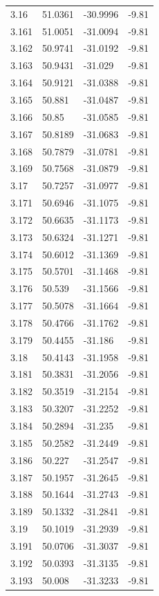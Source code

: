 \begin{tabular}{llll}
3.16 & 51.0361 & -30.9996 & -9.81 \\
3.161 & 51.0051 & -31.0094 & -9.81 \\
3.162 & 50.9741 & -31.0192 & -9.81 \\
3.163 & 50.9431 & -31.029 & -9.81 \\
3.164 & 50.9121 & -31.0388 & -9.81 \\
3.165 & 50.881 & -31.0487 & -9.81 \\
3.166 & 50.85 & -31.0585 & -9.81 \\
3.167 & 50.8189 & -31.0683 & -9.81 \\
3.168 & 50.7879 & -31.0781 & -9.81 \\
3.169 & 50.7568 & -31.0879 & -9.81 \\
3.17 & 50.7257 & -31.0977 & -9.81 \\
3.171 & 50.6946 & -31.1075 & -9.81 \\
3.172 & 50.6635 & -31.1173 & -9.81 \\
3.173 & 50.6324 & -31.1271 & -9.81 \\
3.174 & 50.6012 & -31.1369 & -9.81 \\
3.175 & 50.5701 & -31.1468 & -9.81 \\
3.176 & 50.539 & -31.1566 & -9.81 \\
3.177 & 50.5078 & -31.1664 & -9.81 \\
3.178 & 50.4766 & -31.1762 & -9.81 \\
3.179 & 50.4455 & -31.186 & -9.81 \\
3.18 & 50.4143 & -31.1958 & -9.81 \\
3.181 & 50.3831 & -31.2056 & -9.81 \\
3.182 & 50.3519 & -31.2154 & -9.81 \\
3.183 & 50.3207 & -31.2252 & -9.81 \\
3.184 & 50.2894 & -31.235 & -9.81 \\
3.185 & 50.2582 & -31.2449 & -9.81 \\
3.186 & 50.227 & -31.2547 & -9.81 \\
3.187 & 50.1957 & -31.2645 & -9.81 \\
3.188 & 50.1644 & -31.2743 & -9.81 \\
3.189 & 50.1332 & -31.2841 & -9.81 \\
3.19 & 50.1019 & -31.2939 & -9.81 \\
3.191 & 50.0706 & -31.3037 & -9.81 \\
3.192 & 50.0393 & -31.3135 & -9.81 \\
3.193 & 50.008 & -31.3233 & -9.81 \\

\end{tabular}
